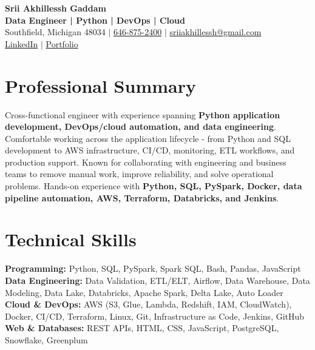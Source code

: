 \documentclass[letterpaper,10pt]{article}
\begin{document}
\fontsize{9.35pt}{10.45pt}\selectfont

\begin{center}
    {\LARGE \textbf{Srii Akhillessh Gaddam}} \\[-1pt]
    \textbf{Data Engineer | Python | DevOps | Cloud} \\[2pt]
    Southfield, Michigan 48034 $|$
    \href{tel:6468752400}{646-875-2400} $|$
    \href{mailto:sriiakhillessh@gmail.com}{sriiakhillessh@gmail.com} \\[1pt]
    \href{https://www.linkedin.com/in/srii-akhiilessh-gaddam-b48668191/}{LinkedIn} $|$
    \href{https://sriiakhillesshg.github.io/portfolio/}{Portfolio}
\end{center}
\vspace{-8pt}

\section{Professional Summary}
\small{Cross-functional engineer with experience spanning \textbf{Python application development, DevOps/cloud automation, and data engineering}. Comfortable working across the application lifecycle - from Python and SQL development to AWS infrastructure, CI/CD, monitoring, ETL workflows, and production support. Known for collaborating with engineering and business teams to remove manual work, improve reliability, and solve operational problems. Hands-on experience with \textbf{Python, SQL, PySpark, Docker, data pipeline automation, AWS, Terraform, Databricks, and Jenkins}.}

\section{Technical Skills}
\small{
\textbf{Programming:} Python, SQL, PySpark, Spark SQL, Bash, Pandas, JavaScript \\
\textbf{Data Engineering:} Data Validation, ETL/ELT, Airflow, Data Warehouse, Data Modeling, Data Lake, Databricks, Apache Spark, Delta Lake, Auto Loader \\
\textbf{Cloud \& DevOps:} AWS (S3, Glue, Lambda, Redshift, IAM, CloudWatch), Docker, CI/CD, Terraform, Linux, Git, Infrastructure as Code, Jenkins, GitHub \\
\textbf{Web \& Databases:} REST APIs, HTML, CSS, JavaScript, PostgreSQL, Snowflake, Greenplum
}
\end{document}
